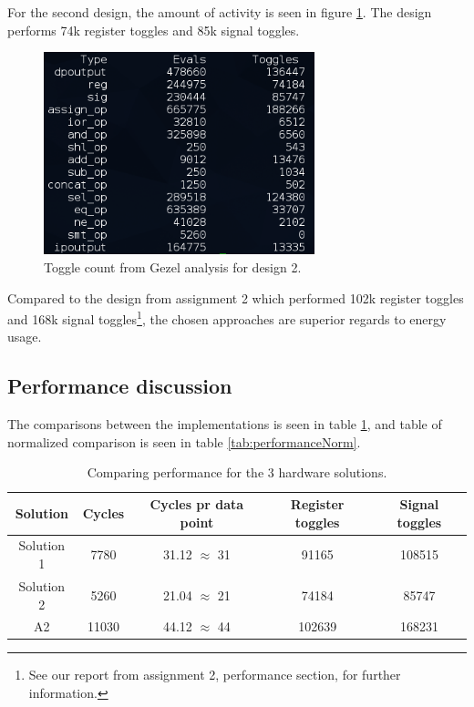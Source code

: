 For the second design, the amount of activity is seen in figure \ref{fig:ToggleCount2}. The design performs 74k register toggles and 85k signal toggles.

\begin{figure}[H]
    \centering
    \includegraphics[width=0.7\textwidth]{3Results/fig/Parallel_WO_BUS}
    \caption{Toggle count from Gezel analysis for design 2.}
    \label{fig:ToggleCount2}
\end{figure}

Compared to the design from assignment 2 which performed 102k register toggles and 168k signal toggles\footnote{See our report from assignment 2, performance section, for further information.}, the chosen approaches are superior regards to energy usage.

\subsection{Performance discussion}\label{sec:performanceDiscussion}

The comparisons between the implementations is seen in table \ref{tab:performance}, and table of normalized comparison is  seen in table \ref{tab:performanceNorm}.


\begin{table}[H]
    \centering
    \begin{tabular}{|c|c|c|c|c|}
    \hline 
    \textbf{Solution}   & \textbf{Cycles} & \textbf{Cycles pr data point} & \textbf{Register toggles} & \textbf{Signal toggles} \\ \hline
    Solution 1 & 7780   & 31.12 $\approx$ 31           & 91165            & 108515         \\ \hline
    Solution 2 & 5260   & 21.04 $\approx$ 21           & 74184            & 85747          \\ \hline
    A2       & 11030  & 44.12 $\approx$ 44           & 102639           & 168231         \\ \hline
    \end{tabular} 
    \caption{Comparing performance for the 3 hardware solutions.}
    \label{tab:performance}
\end{table}

